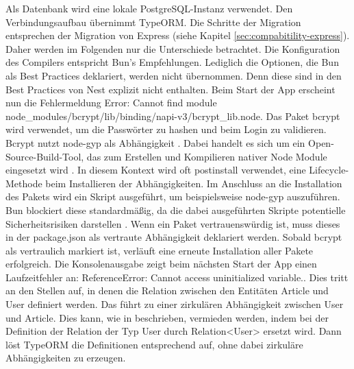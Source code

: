 \noindent
Als Datenbank wird eine lokale PostgreSQL-Instanz verwendet. Den Verbindungsaufbau übernimmt TypeORM. Die Schritte der Migration entsprechen der Migration von Express (siehe Kapitel \ref{sec:compabitility-express}). Daher werden im Folgenden nur die Unterschiede betrachtet. Die Konfiguration des Compilers entspricht Bun's Empfehlungen. Lediglich die Optionen, die Bun als Best Practices deklariert, werden nicht übernommen. Denn diese sind in den Best Practices von Nest explizit nicht enthalten. \newline
Beim Start der App erscheint nun die Fehlermeldung \glq Error: Cannot find module node\_modules/bcrypt/lib/binding/napi-v3/bcrypt\_lib.node\grq{}. Das Paket \glq bcrypt\grq{} wird verwendet, um die Passwörter zu hashen und beim Login zu validieren. \glq Bcrypt\grq{} nutzt \glq node-gyp\grq{} als Abhängigkeit \cite{DelGobbo.2018}. Dabei handelt es sich um ein Open-Source-Build-Tool, das zum Erstellen und Kompilieren nativer Node Module eingesetzt wird \cite{OpenJSFoundation.o.J.b}. In diesem Kontext wird oft \glq postinstall\grq{} verwendet, eine Lifecycle-Methode beim Installieren der Abhängigkeiten. Im Anschluss an die Installation des Pakets wird ein Skript ausgeführt, um beispielsweise \glq node-gyp\grq{} auszuführen. Bun blockiert diese standardmäßig, da die dabei ausgeführten Skripte potentielle Sicherheitsrisiken darstellen \cite{OvenSh.2023}. Wenn ein Paket vertrauenswürdig ist, muss dieses in der \glq package.json\grq{} als vertraute Abhängigkeit deklariert werden. Sobald \glq bcrypt\grq{} als vertraulich markiert ist, verläuft eine erneute Installation aller Pakete erfolgreich.\newline
Die Konsolenausgabe zeigt beim nächsten Start der App einen Laufzeitfehler an: \glq ReferenceError: Cannot access uninitialized variable.\grq{}. Dies tritt an den Stellen auf, in denen die Relation zwischen den Entitäten \glq Article\grq{} und \glq User\grq{} definiert werden. Das führt zu einer zirkulären Abhängigkeit zwischen \glq User\grq{} und \glq Article\grq{}. Dies kann, wie in \cite{TypeORM.} beschrieben, vermieden werden, indem bei der Definition der Relation der Typ \glq User\grq{} durch \glq Relation<User>\grq{} ersetzt wird. Dann löst TypeORM die Definitionen entsprechend auf, ohne dabei zirkuläre Abhängigkeiten zu erzeugen.\\

